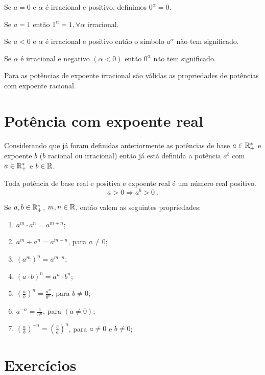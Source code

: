  Se $a=0$ e $\alpha$ é irracional e positivo, definimos $0^{\alpha}=0$.

 \begin{obs}
 Se $a=1$ então $1^{\alpha}= 1, \forall \alpha$ irracional.
 \end{obs}

 \begin{obs}
 Se $a < 0$ e $\alpha$ é irracional e positivo então o símbolo $a^{\alpha}$ não tem significado.
 \end{obs}

 \begin{obs}
 Se $\alpha$ é irracional e negativo $(\alpha < 0)$ então $0^{\alpha}$ não tem significado.
 \end{obs}

 \begin{obs}
 Para as potências de expoente irracional são válidas as propriedades de potências com expoente racional.
 \end{obs}

 \section{Potência com expoente real}

 Considerando que já foram definidas anteriormente as potências de base $a \in \mathbb{R}^{*}_{+}$ e expoente $b$ ($b$ racional ou  irracional) então já está definida a potência $a^b$ com $a \in \mathbb{R}^{*}_{+}$ e $b \in \mathbb{R}$.

 \begin{obs}
 Toda potência de base real e positiva e expoente real é um número real positivo.
\begin{equation}
a> 0 \Rightarrow a^b > 0 \ .
\end{equation}
 \end{obs}

  Se $a, b \in \mathbb{R}^{*}_{+}$, $m, n \in \mathbb{R}$, então valem as seguintes propriedades:
 \begin{enumerate}[P1)]
 \item $a^m \cdot a^n= a^{m + n}$;
 \item $a^m \div a^n= a^{m - n}$, para $a \neq 0$;
 \item $(a^m)^n= a^{m \cdot n}$;
 \item $(a \cdot b)^n= a^n \cdot b^n$;
 \item $\left(\frac{a}{b}\right)^n= \frac{a^n}{b^n}$, para $b \neq 0$;
 \item $a^{-n}= \frac{1}{a^n}$, para $(a \neq 0)$;
 \item $\left(\frac{a}{b} \right)^{-n}= \left(\frac{b}{a} \right)^{n}$, para $a \neq 0$ e $b \neq 0$;
 \end{enumerate}

\section{Exercícios}

\construirExer